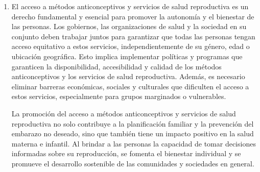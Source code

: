 \documentclass[8pt,a4paper]{beamer}
\begin{document}
{\begin{frame}{}
\begin{block}{}
\begin{enumerate}
\end{enumerate}
\end{block}
\end{frame}

\begin{frame}{}
\begin{block}{}
\setlength{\parskip}{3px}
\justifying
\begin{enumerate}
\setlength{\parskip}{3px}
\justifying
\item[{}] 

El acceso a métodos anticonceptivos y servicios de salud reproductiva es un derecho fundamental y esencial para promover la autonomía y el bienestar de las personas. Los gobiernos, las organizaciones de salud y la sociedad en su conjunto deben trabajar juntos para garantizar que todas las personas tengan acceso equitativo a estos servicios, independientemente de su género, edad o ubicación geográfica. Esto implica implementar políticas y programas que garanticen la disponibilidad, accesibilidad y calidad de los métodos anticonceptivos y los servicios de salud reproductiva. Además, es necesario eliminar barreras económicas, sociales y culturales que dificulten el acceso a estos servicios, especialmente para grupos marginados o vulnerables.

La promoción del acceso a métodos anticonceptivos y servicios de salud reproductiva no solo contribuye a la planificación familiar y la prevención del embarazo no deseado, sino que también tiene un impacto positivo en la salud materna e infantil. Al brindar a las personas la capacidad de tomar decisiones informadas sobre su reproducción, se fomenta el bienestar individual y se promueve el desarrollo sostenible de las comunidades y sociedades en general.
\end{enumerate}
\end{block}
\end{frame}


}
\end{document}
